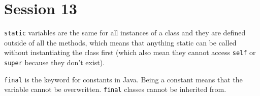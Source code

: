 \section{Session 13}\label{sec:session_13}

\texttt{static} variables are the same for all instances of a class and they are defined outside of all the methods, which means that anything static can be called without instantiating the class first (which also mean they cannot access \texttt{self} or \texttt{super} because they don't exist).

\texttt{final} is the keyword for constants in Java.
Being a constant means that the variable cannot be overwritten.
\texttt{final} classes cannot be inherited from.
